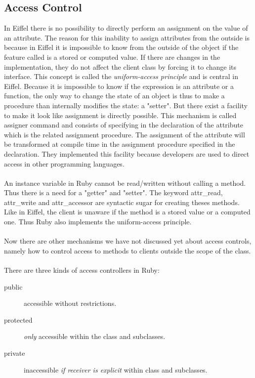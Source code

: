 \documentclass[12pt,a4paper,twocolumn]{article}
\begin{document}
\subsection{Access Control}
In Eiffel there is no possibility to directly perform an assignment on the value of an attribute. The reason for this inability to assign attributes from the outside is because in Eiffel it is impossible to know from the outside of the object if the feature called is a stored or computed value. If there are changes in the implementation, they do not affect the client class by forcing it to change its interface. This concept is called the \emph{uniform-access principle} \cite{meyer2001eiffel, wiki:uniform} and is central in Eiffel. Because it is impossible to know if the expression is an attribute or a function, the only way to change the state of an object is thus to make a procedure than internally modifies the state: a "setter". But there exist a facility to make it look like assignment is directly possible. This mechanism is called assigner command and consists of specifying in the declaration of the attribute which is the related assignment procedure. The assignment of the attribute will be transformed at compile time in the assignment procedure specified in the declaration. They implemented this facility because developers are used to direct access in other programming languages.
\\
\\
An instance variable in Ruby cannot be read/written without calling a method. Thus there is a need for a  "getter" and "setter". The keyword attr\_read, attr\_write and attr\_accessor are syntactic sugar for creating theses methods. Like in Eiffel, the client is unaware if the method is a stored value or a computed one. Thus Ruby also implements the uniform-access principle.
\\
\\
Now there are other mechanisms we have not discussed yet about access controls, namely how to control access to methods to clients outside the scope of the class.
\\
\\
There are three kinds of access controllers in Ruby\cite{wiki:class}: 
\begin{description}
\item[public] accessible without restrictions.
\item[protected] \textit{only} accessible within the class and subclasses.
\item[private] inaccessible \textit{if receiver is explicit} within class and subclasses.
\end{description}
\end{document}
